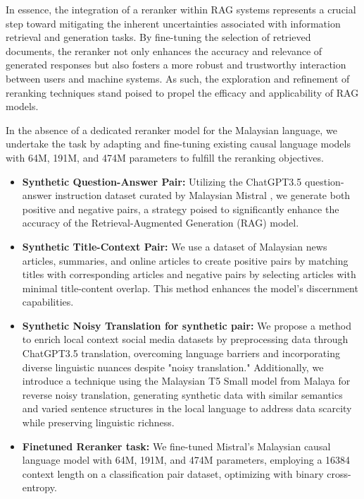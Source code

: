 \documentclass[preprint]{article}
\begin{document}
In essence, the integration of a reranker within RAG systems represents a crucial step toward mitigating the inherent uncertainties associated with information retrieval and generation tasks. By fine-tuning the selection of retrieved documents, the reranker not only enhances the accuracy and relevance of generated responses but also fosters a more robust and trustworthy interaction between users and machine systems. As such, the exploration and refinement of reranking techniques stand poised to propel the efficacy and applicability of RAG models.

In the absence of a dedicated reranker model for the Malaysian language, we undertake the task by adapting and fine-tuning existing causal language models with 64M, 191M, and 474M parameters to fulfill the reranking objectives.

\begin{itemize}

  \item \textbf{Synthetic Question-Answer Pair:} Utilizing the ChatGPT3.5 question-answer instruction dataset curated by Malaysian Mistral \cite{zolkepli2024large}, we generate both positive and negative pairs, a strategy poised to significantly enhance the accuracy of the Retrieval-Augmented Generation (RAG) model.

  \item \textbf{Synthetic Title-Context Pair:}  We use a dataset of Malaysian news articles, summaries, and online articles to create positive pairs by matching titles with corresponding articles and negative pairs by selecting articles with minimal title-content overlap. This method enhances the model's discernment capabilities.

  \item \textbf{Synthetic Noisy Translation for synthetic pair:} We propose a method to enrich local context social media datasets by preprocessing data through ChatGPT3.5 translation, overcoming language barriers and incorporating diverse linguistic nuances despite "noisy translation." Additionally, we introduce a technique using the Malaysian T5 Small model from Malaya for reverse noisy translation, generating synthetic data with similar semantics and varied sentence structures in the local language to address data scarcity while preserving linguistic richness.

  \item \textbf{Finetuned Reranker task:} We fine-tuned Mistral's Malaysian causal language model with 64M, 191M, and 474M parameters, employing a 16384 context length on a classification pair dataset, optimizing with binary cross-entropy.

\end{itemize}
\end{document}
